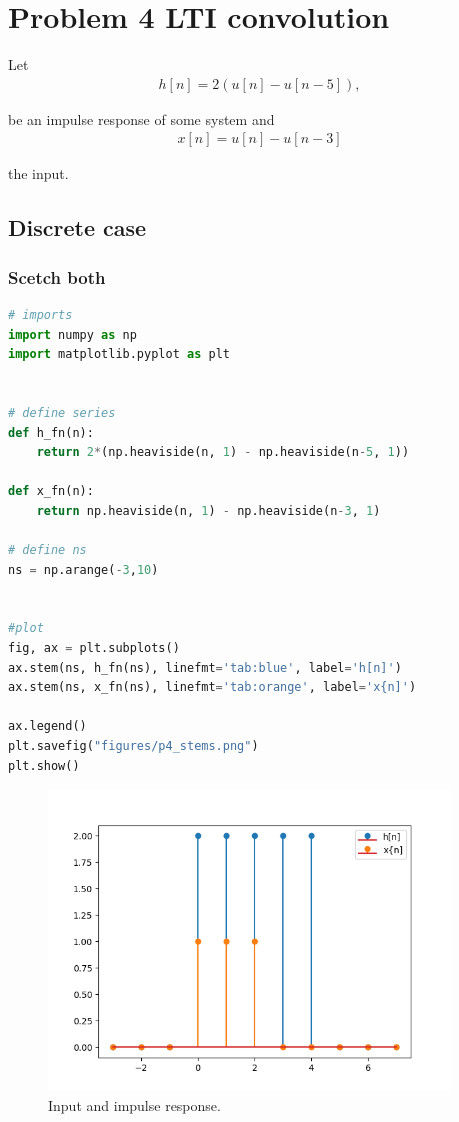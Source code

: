 \section*{Problem 4 LTI convolution}
Let 
\begin{align}
    h[n] = 2(u[n] - u[n-5]),
\end{align}

be an impulse response of some system and 
\begin{align}
    x[n] = u[n] - u[n-3]
\end{align}

the input.
\subsection*{Discrete case}
\subsubsection*{Scetch both}
\begin{lstlisting}[language=python]
# imports
import numpy as np
import matplotlib.pyplot as plt


# define series
def h_fn(n):
    return 2*(np.heaviside(n, 1) - np.heaviside(n-5, 1))

def x_fn(n):
    return np.heaviside(n, 1) - np.heaviside(n-3, 1)

# define ns
ns = np.arange(-3,10)


#plot 
fig, ax = plt.subplots()
ax.stem(ns, h_fn(ns), linefmt='tab:blue', label='h[n]')
ax.stem(ns, x_fn(ns), linefmt='tab:orange', label='x{n]')

ax.legend()
plt.savefig("figures/p4_stems.png")
plt.show()
\end{lstlisting}
\clearpage

\begin{figure}[h!]
    \begin{center}
        \includegraphics[width=0.95\textwidth]{figures/p4_stems.png}
    \end{center}
    \caption{Input and impulse response.}
\end{figure}

